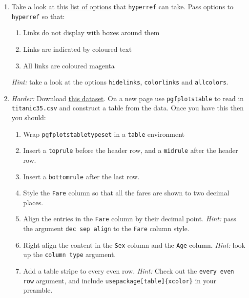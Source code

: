 \documentclass{article}
\begin{document}
\begin{enumerate}[label=\color{purple}\theenumi.]
  \item Take a look at
    \href{http://mirror.ox.ac.uk/sites/ctan.org/macros/latex/contrib/hyperref/doc/manual.pdf#page=10}
        {this list of options} that \texttt{hyperref} can take. Pass options to 
    \texttt{hyperref} so that:
    \begin{enumerate}[label=\color{purple}\roman*)]
      \item Links do not display with boxes around them
      \item Links are indicated by coloured text
      \item All links are coloured magenta
    \end{enumerate}
    \textsl{Hint:} take a look at the options \texttt{hidelinks},
    \texttt{colorlinks} and \texttt{allcolors}.

  \item \emph{Harder:} Download
    \href{https://jwalton.info/assets/teaching/latex/titanic35.csv}%
    {this dataset}. On a new page use \texttt{pgfplotstable} to read in 
    \texttt{titanic35.csv} and construct a table from the data. Once you have
    this then you should:
    \begin{enumerate}[label=\color{purple}\roman*)]
      \item Wrap \texttt{pgfplotstabletypeset} in a \texttt{table} environment
      \item Insert a \texttt{toprule} before the header row, and a
        \texttt{midrule} after the header row.
      \item Insert a \texttt{bottomrule} after the last row.
      \item Style the \texttt{Fare} column so that all the fares are shown to
        two decimal places.
      \item Align the entries in the \texttt{Fare} column by their decimal
        point. \emph{Hint:} pass the argument \texttt{dec sep align} to the 
        \texttt{Fare} column style.
      \item Right align the content in the \texttt{Sex} column and the
        \texttt{Age} column. \emph{Hint:} look up the \texttt{column type}
	argument.
      \item Add a table stripe to every even row. \emph{Hint:} Check out the 
        \texttt{every even row} argument, and include 
        \texttt{\tb usepackage[table]\{xcolor\}} in your preamble.
    \end{enumerate}
\end{enumerate}
\end{document}
